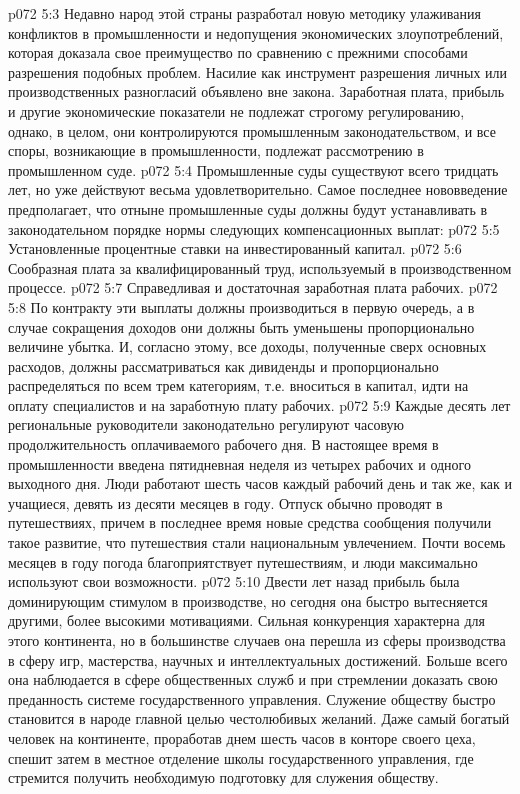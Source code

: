 \vs p072 5:3 \pc Недавно народ этой страны разработал новую методику улаживания конфликтов в промышленности и недопущения экономических злоупотреблений, которая доказала свое преимущество по сравнению с прежними способами разрешения подобных проблем. Насилие как инструмент разрешения личных или производственных разногласий объявлено вне закона. Заработная плата, прибыль и другие экономические показатели не подлежат строгому регулированию, однако, в целом, они контролируются промышленным законодательством, и все споры, возникающие в промышленности, подлежат рассмотрению в промышленном суде.
\vs p072 5:4 Промышленные суды существуют всего тридцать лет, но уже действуют весьма удовлетворительно. Самое последнее нововведение предполагает, что отныне промышленные суды должны будут устанавливать в законодательном порядке нормы следующих компенсационных выплат:
\vs p072 5:5 \bibnobreakspace Установленные процентные ставки на инвестированный капитал.
\vs p072 5:6 \bibnobreakspace Сообразная плата за квалифицированный труд, используемый в производственном процессе.
\vs p072 5:7 \bibnobreakspace Справедливая и достаточная заработная плата рабочих.
\vs p072 5:8 \pc По контракту эти выплаты должны производиться в первую очередь, а в случае сокращения доходов они должны быть уменьшены пропорционально величине убытка. И, согласно этому, все доходы, полученные сверх основных расходов, должны рассматриваться как дивиденды и пропорционально распределяться по всем трем категориям, т.е. вноситься в капитал, идти на оплату специалистов и на заработную плату рабочих.
\vs p072 5:9 \pc Каждые десять лет региональные руководители законодательно регулируют часовую продолжительность оплачиваемого рабочего дня. В настоящее время в промышленности введена пятидневная неделя из четырех рабочих и одного выходного дня. Люди работают шесть часов каждый рабочий день и так же, как и учащиеся, девять из десяти месяцев в году. Отпуск обычно проводят в путешествиях, причем в последнее время новые средства сообщения получили такое развитие, что путешествия стали национальным увлечением. Почти восемь месяцев в году погода благоприятствует путешествиям, и люди максимально используют свои возможности.
\vs p072 5:10 \pc Двести лет назад прибыль была доминирующим стимулом в производстве, но сегодня она быстро вытесняется другими, более высокими мотивациями. Сильная конкуренция характерна для этого континента, но в большинстве случаев она перешла из сферы производства в сферу игр, мастерства, научных и интеллектуальных достижений. Больше всего она наблюдается в сфере общественных служб и при стремлении доказать свою преданность системе государственного управления. Служение обществу быстро становится в народе главной целью честолюбивых желаний. Даже самый богатый человек на континенте, проработав днем шесть часов в конторе своего цеха, спешит затем в местное отделение школы государственного управления, где стремится получить необходимую подготовку для служения обществу.
